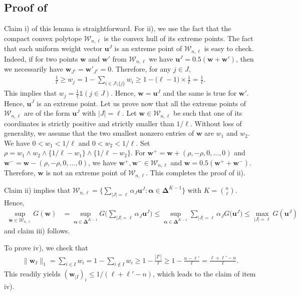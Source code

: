 \documentclass[aos,preprint,reqno]{imsart}
\newcommand\bs{\boldsymbol}
\newcommand\bu{\boldsymbol u}
\newcommand\bw{\boldsymbol w}
\theoremstyle{plain}
\theoremstyle{remark}
\begin{document}
	\subsection{Proof of } 
	Claim i) of this lemma is straightforward. For ii), we use the fact
	that the compact convex polytope $\mathcal W_{n,\ell}$ is the
	convex hull of its extreme points. The fact that each uniform weight 
	vector $\bu^{J}$ is an extreme point of $\mathcal
	W_{n,\ell}$ is easy to check. Indeed, if for two points 
	$\bw$ and $\bw'$ from $\mathcal W_{n,\ell}$ we have
	$\bu^{J} = 0.5(\bw+\bw')$, then we necessarily have
	$\bw_{J^c} = \bw'_{J^c} = 0$. Therefore, 
	for any $j\in J$,
	\begin{align}
			\frac1{\ell} \ge w_j  = 1 - \sum_{i\in J\setminus\{j\}} w_i \ge 
			1-\big(\ell-1)\times \frac1{\ell}=\frac1{\ell}.
	\end{align}
	This implies that $w_j=\frac1{\ell}\mathds 1(j\in J)$. Hence, 
	$\bw = \bu^{J}$ and the same is true for
	$\bw'$. Hence, $\bu^{J}$ is an extreme 
	point. Let us prove now that all the extreme points of $\mathcal
	W_{n,\ell}$ are of the form $\bu^{J}$ with
	$|J| = \ell$. Let $\bw\in \mathcal W_{n,\ell}$ be such that one 
	of its coordinates is strictly positive and strictly smaller 
	than $1/\ell$. Without loss of generality, we assume that the 
	two smallest nonzero entries of $\bw$ are $w_1$ and $w_2$. 
	We have $0<w_1<1/\ell$ and $0<w_2<1/\ell$. Set
	$\rho = w_1\wedge w_2 \wedge \{1/\ell - w_1\}\wedge 
	\{1/\ell - w_2\}$. For $\bw^+ = \bw + (\rho,-\rho,0,\ldots,0)$ 
	and $\bw^- = \bw - (\rho,-\rho, 0,\ldots,0)$, we have 
	$\bw^+,\bw^-\in\mathcal W_{n,\ell}$
	and $\bw = 0.5(\bw^++\bw^-)$. Therefore, $\bw$ is not 
	an extreme point of $\mathcal W_{n,\ell}$. This completes the
	proof of ii). 

	Claim ii) implies that $\mathcal W_{n,\ell} = \{\sum_{|J|=\ell} \alpha_J \bu^J:
	\bs\alpha \in \bs\Delta^{K-1}\}$ with $K={n\choose \ell}$. Hence, 
	\begin{align}
			\sup_{\bw\in \mathcal W_{n,\ell}} G(\bw) &= 
					\sup_{\bs\alpha\in\bs\Delta^{K-1}} G\bigg(\sum_{|J|=\ell} 
					\alpha_J \bu^J\bigg) \le \sup_{\bs\alpha\in\bs\Delta^{K-1}} 
					\sum_{|J|=\ell} \alpha_J G\big(\bu^J\big)
					\le \max_{|J| =\ell} G(\bu^J)
	\end{align}
	and claim iii) follows. 

	To prove iv), we check that 
	\begin{align}
		\|\bw_{ I}\|_1 = \sum_{i\in  I} w_i  
		    = 1 - \sum_{i\not\in  I} w_i
		    \ge 1-\frac{| I^c|}{\ell} \ge 1- \frac{n-\ell'}{\ell} 
			= \frac{\ell+\ell'-n}{\ell}.
	\end{align}
	This readily yields $(\bw_{|I})_i \le 1/(\ell+\ell'-n)$, which 
	leads to the claim of item iv).
\end{document}
